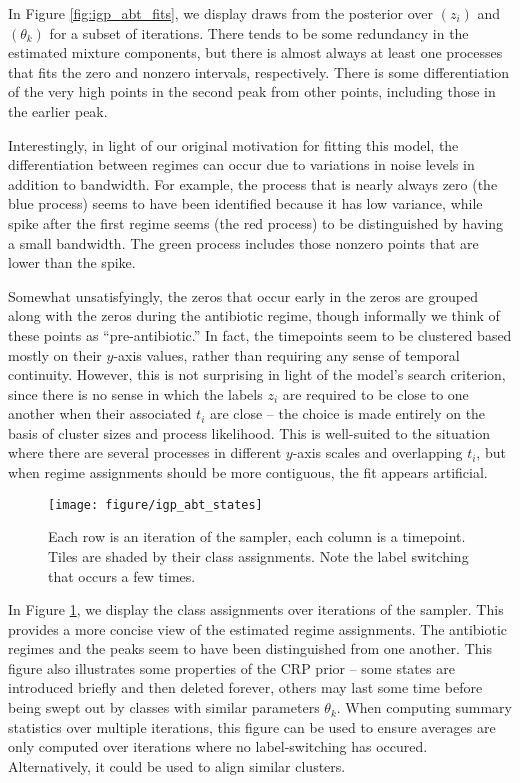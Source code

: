 \documentclass[14pt]{extarticle}
\begin{document}
In Figure \ref{fig:igp_abt_fits}, we display draws from the posterior over
$\left(z_i\right)$ and $\left(\theta_k\right)$ for a subset of iterations. There
tends to be some redundancy in the estimated mixture components, but there is
almost always at least one processes that fits the zero and nonzero intervals,
respectively. There is some differentiation of the very high points in the
second peak from other points, including those in the earlier peak.

Interestingly, in light of our original motivation for fitting this model, the
differentiation between regimes can occur due to variations in noise levels in
addition to bandwidth. For example, the process that is nearly always zero (the
blue process) seems to have been identified because it has low variance, while
spike after the first regime seems (the red process) to be distinguished by
having a small bandwidth. The green process includes those nonzero points that
are lower than the spike.

Somewhat unsatisfyingly, the zeros that occur early in the zeros are grouped
along with the zeros during the antibiotic regime, though informally we think of
these points as ``pre-antibiotic.'' In fact, the timepoints seem to be clustered
based mostly on their $y$-axis values, rather than requiring any sense of
temporal continuity. However, this is not surprising in light of the model's
search criterion, since there is no sense in which the labels $z_i$ are required
to be close to one another when their associated $t_i$ are close -- the choice
is made entirely on the basis of cluster sizes and process likelihood. This is
well-suited to the situation where there are several processes in different
$y$-axis scales and overlapping $t_i$, but when regime assignments should be
more contiguous, the fit appears artificial.

\begin{figure}
  \centering
  \texttt{[image: figure/igp\_abt\_states]}
  \caption{Each row is an iteration of the sampler, each column is a timepoint.
    Tiles are shaded by their class assignments. Note the label switching that
    occurs a few times. \label{fig:igp_abt_states} }
\end{figure}

In Figure \ref{fig:igp_abt_states}, we display the class assignments over
iterations of the sampler. This provides a more concise view of the estimated
regime assignments. The antibiotic regimes and the peaks seem to have been
distinguished from one another. This figure also illustrates some properties of
the CRP prior -- some states are introduced briefly and then deleted forever,
others may last some time before being swept out by classes with similar
parameters $\theta_k$. When computing summary statistics over multiple
iterations, this figure can be used to ensure averages are only computed over
iterations where no label-switching has occured. Alternatively, it could be used
to align similar clusters.
\end{document}
